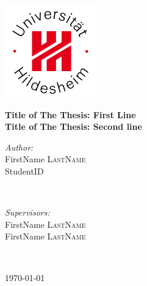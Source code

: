 \documentclass[a4paper,12pt]{report}
\begin{document}
\begin{titlepage}
\center %

\vspace{-1cm}
\includegraphics[width=4cm]{img/logoUHi.jpg}
\vspace{2cm}

{ \Large \bfseries Title of The Thesis: First Line}\\  %
\vspace{0.5cm}
{ \Large \bfseries Title of The Thesis: Second line}\\ %
\vspace{0.5cm}
\vspace{2cm}

\begin{minipage}{0.49\textwidth}
\begin{flushleft} \large
\emph{Author:}\\
FirstName \textsc{LastName} \\ %
StudentID \\ %
\end{flushleft}
\end{minipage}
~
\begin{minipage}{0.46\textwidth}
\begin{flushright} \large
\emph{Supervisors:} \\
FirstName \textsc{LastName} \\ %
FirstName \textsc{LastName} %
\end{flushright}
\end{minipage}\\
\vspace{2cm}

{ \today}\\ %
\vspace{1cm}


\end{titlepage}
\end{document}
